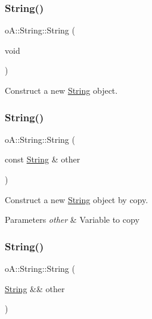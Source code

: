 \subsubsection{\texorpdfstring{String()}{String()}\hspace{0.1cm}{\footnotesize\ttfamily [1/7]}}
{\footnotesize\ttfamily o\+A\+::\+String\+::\+String (\begin{DoxyParamCaption}\item[{void}]{ }\end{DoxyParamCaption})\hspace{0.3cm}{\ttfamily [inline]}}



Construct a new \mbox{\hyperlink{classo_a_1_1_string}{String}} object. 

\mbox{\label{classo_a_1_1_string_adeb13912c55cdc0406b5960d75d74fb2}} 
\subsubsection{\texorpdfstring{String()}{String()}\hspace{0.1cm}{\footnotesize\ttfamily [2/7]}}
{\footnotesize\ttfamily o\+A\+::\+String\+::\+String (\begin{DoxyParamCaption}\item[{const \mbox{\hyperlink{classo_a_1_1_string}{String}} \&}]{other }\end{DoxyParamCaption})\hspace{0.3cm}{\ttfamily [inline]}}



Construct a new \mbox{\hyperlink{classo_a_1_1_string}{String}} object by copy. 


\begin{DoxyParams}{Parameters}
{\em other} & Variable to copy \\
\hline
\end{DoxyParams}
\mbox{\label{classo_a_1_1_string_ae728fbb314314b37c103d3b22ca4c3a9}} 
\subsubsection{\texorpdfstring{String()}{String()}\hspace{0.1cm}{\footnotesize\ttfamily [3/7]}}
{\footnotesize\ttfamily o\+A\+::\+String\+::\+String (\begin{DoxyParamCaption}\item[{\mbox{\hyperlink{classo_a_1_1_string}{String}} \&\&}]{other }\end{DoxyParamCaption})\hspace{0.3cm}{\ttfamily [inline]}}



